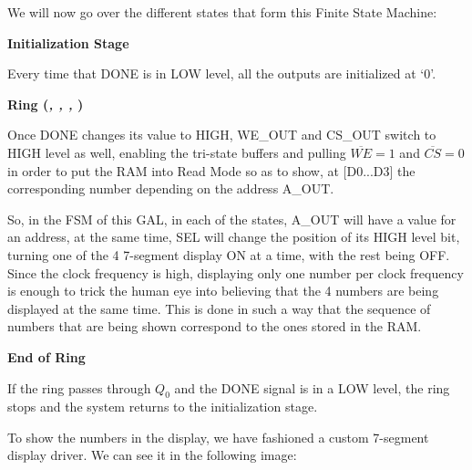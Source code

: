 We will now go over the different states that form this Finite State Machine:\bigskip

\textbf{Initialization Stage}\medskip

Every time that DONE is in LOW level, all the outputs are initialized at ‘0’. \medskip

\textbf{Ring (\textit{, , , })}
\medskip

Once DONE changes its value to HIGH,  WE\_OUT and CS\_OUT switch to HIGH level as well, enabling the tri-state buffers and pulling $\overline{WE} = 1$ and $\overline{CS}=0$ in order to put the RAM into Read Mode so as to show, at [D0...D3] the corresponding number depending on the address A\_OUT.\medskip

So, in the FSM of this GAL, in each of the states, A\_OUT will have a value for an address, at the same time, SEL will change the position of its HIGH level bit, turning one of the 4  7-segment display ON at a time, with the rest being OFF. Since the clock frequency is high, displaying only one number per clock frequency is enough to trick the human eye into believing that the 4 numbers are being displayed at the same time. This is done in such a way that the sequence of numbers that are being shown correspond to the ones stored in the RAM.\medskip

\medskip
{ \textbf{End of Ring}}
\medskip

If the ring passes through \textit{$Q_0$} and the DONE signal is in a LOW level, the ring stops and the system returns to the initialization stage.  


To show the numbers in the display, we have fashioned a custom 7-segment display driver. We can see it in the following image:

